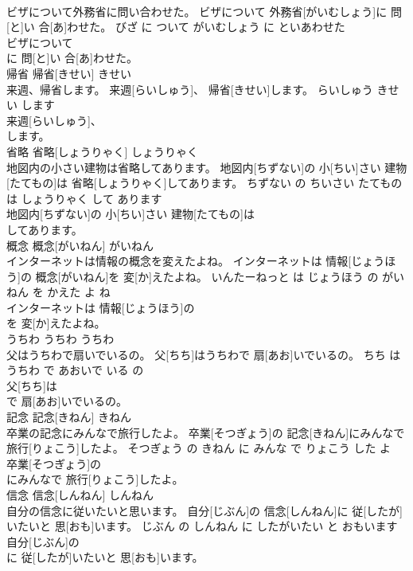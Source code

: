 \documentclass[8pt]{extreport}
\begin{document}
\begin{CJK}{UTF8}{min}
\\	ビザについて外務省に問い合わせた。	ビザについて 外務省[がいむしょう]に 問[と]い 合[あ]わせた。	びざ に ついて がいむしょう に といあわせた	
\\	ビザについて
\\	に 問[と]い 合[あ]わせた。			
\\	帰省	帰省[きせい]	きせい	
\\	来週、帰省します。	来週[らいしゅう]、 帰省[きせい]します。	らいしゅう きせい します	
\\	来週[らいしゅう]、
\\	します。			
\\	省略	省略[しょうりゃく]	しょうりゃく	
\\	地図内の小さい建物は省略してあります。	地図内[ちずない]の 小[ちい]さい 建物[たてもの]は 省略[しょうりゃく]してあります。	ちずない の ちいさい たてもの は しょうりゃく して あります	
\\	地図内[ちずない]の 小[ちい]さい 建物[たてもの]は
\\	してあります。			
\\	概念	概念[がいねん]	がいねん	
\\	インターネットは情報の概念を変えたよね。	インターネットは 情報[じょうほう]の 概念[がいねん]を 変[か]えたよね。	いんたーねっと は じょうほう の がいねん を かえた よ ね	
\\	インターネットは 情報[じょうほう]の
\\	を 変[か]えたよね。			
\\	うちわ	うちわ	うちわ	
\\	父はうちわで扇いでいるの。	父[ちち]はうちわで 扇[あお]いでいるの。	ちち は うちわ で あおいで いる の	
\\	父[ちち]は
\\	で 扇[あお]いでいるの。			
\\	記念	記念[きねん]	きねん	
\\	卒業の記念にみんなで旅行したよ。	卒業[そつぎょう]の 記念[きねん]にみんなで 旅行[りょこう]したよ。	そつぎょう の きねん に みんな で りょこう した よ	
\\	卒業[そつぎょう]の
\\	にみんなで 旅行[りょこう]したよ。			
\\	信念	信念[しんねん]	しんねん	
\\	自分の信念に従いたいと思います。	自分[じぶん]の 信念[しんねん]に 従[したが]いたいと 思[おも]います。	じぶん の しんねん に したがいたい と おもいます	
\\	自分[じぶん]の
\\	に 従[したが]いたいと 思[おも]います。			

\end{CJK}
\end{document}
